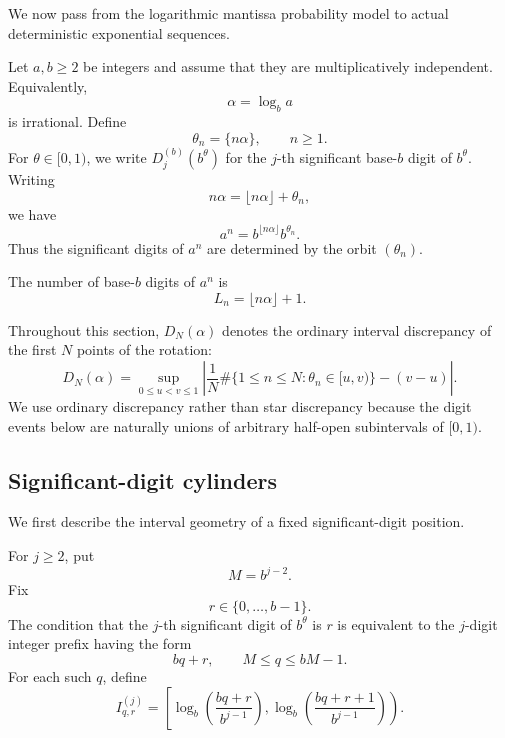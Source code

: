 \documentclass[11pt]{article}
\theoremstyle{definition}
\theoremstyle{remark}
\begin{document}
We now pass from the logarithmic mantissa probability model to actual
deterministic exponential sequences.

Let \(a,b\ge2\) be integers and assume that they are multiplicatively
independent.  Equivalently,
\[
    \alpha=\log_b a
\]
is irrational.  Define
\begin{equation}
    \theta_n=\{n\alpha\},
    \qquad n\ge1.
    \label{eq:theta-n-deterministic}
\end{equation}
For \(\theta\in[0,1)\), we write
\(D_j^{(b)}(b^\theta)\) for the \(j\)-th significant
base-\(b\) digit of \(b^\theta\).
Writing
\[
    n\alpha=\lfloor n\alpha\rfloor+\theta_n,
\]
we have
\begin{equation}
    a^n
    =
    b^{\lfloor n\alpha\rfloor}
    b^{\theta_n}.
    \label{eq:power-mantissa-decomposition}
\end{equation}
Thus the significant digits of \(a^n\) are determined by the orbit
\((\theta_n)\).

The number of base-\(b\) digits of \(a^n\) is
\begin{equation}
    L_n
    =
    \lfloor n\alpha\rfloor+1.
    \label{eq:L-n-deterministic}
\end{equation}

Throughout this section, \(D_N(\alpha)\) denotes the ordinary interval
discrepancy of the first \(N\) points of the rotation:
\begin{equation}
\boxed{
    D_N(\alpha)
    =
    \sup_{0\le u<v\le1}
    \left|
        \frac1N
        \#\{1\le n\le N:\theta_n\in[u,v)\}
        -(v-u)
    \right|.
}
\label{eq:ordinary-discrepancy}
\end{equation}
We use ordinary discrepancy rather than star discrepancy because the
digit events below are naturally unions of arbitrary half-open
subintervals of \([0,1)\).


\subsection{Significant-digit cylinders}
\label{subsec:digit-cylinders}

We first describe the interval geometry of a fixed significant-digit
position.

For \(j\ge2\), put
\[
    M=b^{j-2}.
\]
Fix
\[
    r\in\{0,\ldots,b-1\}.
\]
The condition that the \(j\)-th significant digit of \(b^\theta\) is
\(r\) is equivalent to the \(j\)-digit integer prefix having the form
\[
    bq+r,
    \qquad
    M\le q\le bM-1.
\]
For each such \(q\), define
\begin{equation}
    I_{q,r}^{(j)}
    =
    \left[
        \log_b
        \left(
            \frac{bq+r}{b^{j-1}}
        \right),
        \log_b
        \left(
            \frac{bq+r+1}{b^{j-1}}
        \right)
    \right).
    \label{eq:digit-cylinder}
\end{equation}
\end{document}
